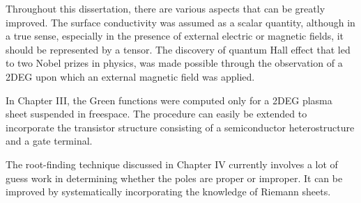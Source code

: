 Throughout this dissertation, there are various aspects that can be greatly improved. The surface conductivity was assumed as a scalar quantity, although in a true sense, especially in the presence of external electric or magnetic fields, it should be represented by a tensor. The discovery of quantum Hall effect that led to two Nobel prizes in physics, was made possible through the observation of a 2DEG upon which an external magnetic field was applied.

In Chapter III, the Green functions were computed only for a 2DEG plasma sheet suspended in freespace. The procedure can easily be extended to incorporate the transistor structure consisting of a semiconductor heterostructure and a gate terminal.

The root-finding technique discussed in Chapter IV currently involves a lot of guess work in determining whether the poles are proper or improper. It can be improved by systematically incorporating the knowledge of Riemann sheets.

